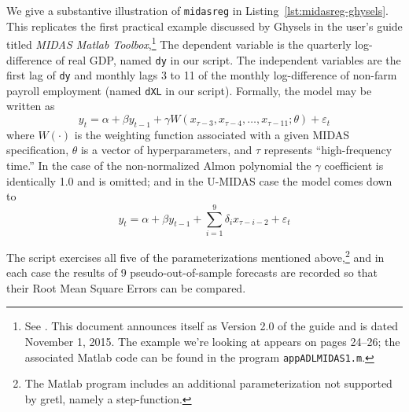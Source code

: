 \documentclass{article}
\begin{document}
We give a substantive illustration of \texttt{midasreg} in
Listing~\ref{lst:midasreg-ghysels}. This replicates the first
practical example discussed by Ghysels in the user's guide titled
\textit{MIDAS Matlab Toolbox},\footnote{See \cite{ghysels15}. This
  document announces itself as Version 2.0 of the guide and is dated
  November 1, 2015. The example we're looking at appears on pages
  24--26; the associated \textsf{Matlab} code can be found in the
  program \texttt{appADLMIDAS1.m}.}
The dependent variable is the quarterly log-difference of
real GDP, named \texttt{dy} in our script. The independent variables
are the first lag of \texttt{dy} and monthly lags 3 to 11 of the
monthly log-difference of non-farm payroll employment (named
\texttt{dXL} in our script). Formally, the model may be written
as
\[
  y_t = \alpha + \beta y_{t-1} + \gamma W(x_{\tau-3}, x_{\tau-4},\dots,
  x_{\tau-11}; \theta) + \varepsilon_t
\]
where $W(\cdot)$ is the weighting function associated with a given
MIDAS specification, $\theta$ is a vector of hyperparameters, and
$\tau$ represents ``high-frequency time.'' In the case of the
non-normalized Almon polynomial the $\gamma$ coefficient is
identically 1.0 and is omitted; and in the U-MIDAS case the model
comes down to
\[
  y_t = \alpha + \beta y_{t-1} + \sum_{i=1}^9 \delta_i x_{\tau-i-2}
  + \varepsilon_t
\]

The script exercises all five of the parameterizations mentioned
above,\footnote{The \textsf{Matlab} program includes an additional
  parameterization not supported by gretl, namely a step-function.}
and in each case the results of 9 pseudo-out-of-sample forecasts are
recorded so that their Root Mean Square Errors can be compared.
\end{document}
